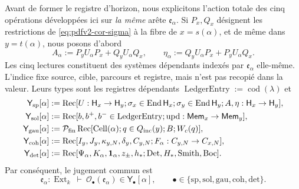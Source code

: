 Avant de former le registre d'horizon, nous explicitons l'action totale des cinq opérations développées ici sur \emph{la même} arête \(\mathfrak e_\alpha\). Si \(P_x,Q_x\) désignent les restrictions de \eqref{eq:pdfv2-cor-sigma} à la fibre de \(x=s(\alpha)\), et de même dans \(y=t(\alpha)\), nous posons d'abord
\begin{equation}
\label{eq:pdfv2-cor-a-eta-emision}
 A_\alpha:=P_yU_\alpha P_x+Q_yU_\alpha Q_x,
 \qquad
 \eta_\alpha:=Q_yU_\alpha P_x+P_yU_\alpha Q_x.
\end{equation}
Les cinq lectures constituent des systèmes dépendants indexés par \(\mathfrak e_\alpha\) elle-même. L'indice fixe source, cible, parcours et registre, mais n'est pas recopié dans la valeur. Leurs types sont les registres dépendants \(\operatorname{LedgerEntry}:=\operatorname{cod}(\lambda)\) et
\begin{align*}
 \mathsf Y_{\rm sp}[\alpha]&:=
 \operatorname{Rec}[U:\mathsf H_x\to\mathsf H_y;
 \sigma_x\in\operatorname{End}\mathsf H_x;
 \sigma_y\in\operatorname{End}\mathsf H_y;A,\eta:\mathsf H_x\to\mathsf H_y],\\
 \mathsf Y_{\rm sol}[\alpha]&:=
 \operatorname{Rec}[b,b^+,b^-\in\operatorname{LedgerEntry};
 \operatorname{upd}:\mathsf{Mem}_x\to\mathsf{Mem}_y],\\
 \mathsf Y_{\rm gau}[\alpha]&:=
 \mathcal P_{\rm fin}\operatorname{Rec}[
 \operatorname{Cell}(\alpha);q\in Q_{\rm inc}(y);B;W_c(q)],\\
 \mathsf Y_{\rm coh}[\alpha]&:=
 \operatorname{Rec}[I_y,J_y,\kappa_{y,N},\delta_y,C_{y,N};
 F_\alpha:C_{y,N}\to C_{x,N}],\\
 \mathsf Y_{\rm det}[\alpha]&:=
 \operatorname{Rec}[\Psi_\alpha,K_\alpha,\mathbf1_\alpha,z_\pm,h_*;
 \operatorname{Det},H_*,\operatorname{Smith},\operatorname{Boc}].
\end{align*}
Par conséquent, le jugement commun est
\[
 \mathfrak e_\alpha:\operatorname{Ext}_k\ \vdash\
 \mathcal O_\bullet(\mathfrak e_\alpha)
 \in\mathsf Y_\bullet[\alpha],
 \qquad
 \bullet\in\{\mathrm{sp,sol,gau,coh,det}\}.
\]
